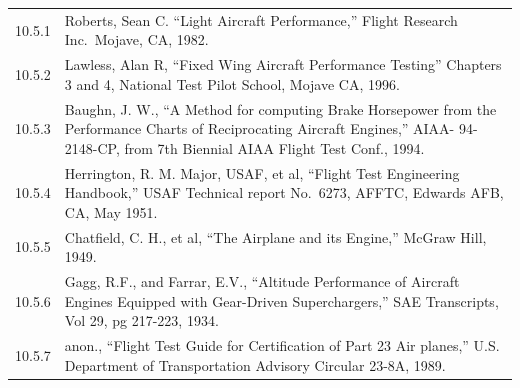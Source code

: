 \documentclass[
]{book}
\begin{document}
\begin{longtable}[]{@{}ll@{}}
\toprule
\endhead
\begin{minipage}[t]{0.06\columnwidth}\raggedright
10.5.1\strut
\end{minipage} & \begin{minipage}[t]{0.88\columnwidth}\raggedright
Roberts, Sean C. ``Light Aircraft Performance,'' Flight Research Inc.~Mojave, CA, 1982.\strut
\end{minipage}\tabularnewline
\begin{minipage}[t]{0.06\columnwidth}\raggedright
10.5.2\strut
\end{minipage} & \begin{minipage}[t]{0.88\columnwidth}\raggedright
Lawless, Alan R, ``Fixed Wing Aircraft Performance Testing'' Chapters 3 and 4, National Test Pilot School, Mojave CA, 1996.\strut
\end{minipage}\tabularnewline
\begin{minipage}[t]{0.06\columnwidth}\raggedright
10.5.3\strut
\end{minipage} & \begin{minipage}[t]{0.88\columnwidth}\raggedright
Baughn, J. W., ``A Method for computing Brake Horsepower from the Performance Charts of Reciprocating Aircraft Engines,'' AIAA- 94-2148-CP, from 7th Biennial AIAA Flight Test Conf., 1994.\strut
\end{minipage}\tabularnewline
\begin{minipage}[t]{0.06\columnwidth}\raggedright
10.5.4\strut
\end{minipage} & \begin{minipage}[t]{0.88\columnwidth}\raggedright
Herrington, R. M. Major, USAF, et al, ``Flight Test Engineering Handbook,'' USAF Technical report No.~6273, AFFTC, Edwards AFB, CA, May 1951.\strut
\end{minipage}\tabularnewline
\begin{minipage}[t]{0.06\columnwidth}\raggedright
10.5.5\strut
\end{minipage} & \begin{minipage}[t]{0.88\columnwidth}\raggedright
Chatfield, C. H., et al, ``The Airplane and its Engine,'' McGraw Hill, 1949.\strut
\end{minipage}\tabularnewline
\begin{minipage}[t]{0.06\columnwidth}\raggedright
10.5.6\strut
\end{minipage} & \begin{minipage}[t]{0.88\columnwidth}\raggedright
Gagg, R.F., and Farrar, E.V., ``Altitude Performance of Aircraft Engines Equipped with Gear-Driven Superchargers,'' SAE Transcripts, Vol 29, pg 217-223, 1934.\strut
\end{minipage}\tabularnewline
\begin{minipage}[t]{0.06\columnwidth}\raggedright
10.5.7\strut
\end{minipage} & \begin{minipage}[t]{0.88\columnwidth}\raggedright
anon., ``Flight Test Guide for Certification of Part 23 Air planes,'' U.S. Department of Transportation Advisory Circular 23-8A, 1989.\strut
\end{minipage}\tabularnewline
\bottomrule
\end{longtable}
\end{document}
